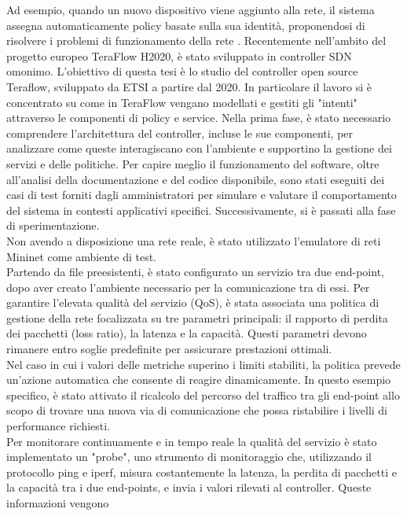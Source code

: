 Ad esempio, quando un nuovo dispositivo viene aggiunto alla rete, 
il sistema assegna automaticamente policy basate sulla sua identità, proponendosi di risolvere i problemi di funzionamento della rete \cite{qoe}.
Recentemente nell'ambito del progetto europeo TeraFlow H2020, è stato sviluppato in controller SDN omonimo. 
L'obiettivo di questa tesi è lo studio del controller open source Teraflow, sviluppato da ETSI \cite{etsi} a partire dal 2020.
In particolare il lavoro si è concentrato su come in TeraFlow vengano modellati e gestiti gli "intenti" attraverso le componenti di policy e service.
Nella prima fase, è stato necessario comprendere l'architettura del controller, incluse le sue componenti, per analizzare come queste interagiscano con l'ambiente e supportino la gestione dei servizi e delle politiche.
Per capire meglio il funzionamento del software, oltre all'analisi della documentazione e del codice disponibile, sono stati eseguiti dei casi di test forniti dagli amministratori per simulare e valutare il comportamento del sistema in contesti applicativi specifici.
Successivamente, si è passati alla fase di sperimentazione.
\\Non avendo a disposizione una rete reale, è stato utilizzato l'emulatore di reti Mininet come ambiente di test.
\\Partendo da file preesistenti, è stato configurato un servizio tra due end-point, dopo aver creato l'ambiente necessario per la comunicazione tra di essi. Per garantire l'elevata qualità del servizio (QoS), è stata associata una politica di 
gestione della rete focalizzata su tre parametri principali: il rapporto di perdita dei pacchetti (loss ratio), la latenza e la capacità. 
Questi parametri devono rimanere entro soglie predefinite per assicurare prestazioni ottimali.
\\Nel caso in cui i valori delle metriche superino i limiti stabiliti, la politica prevede un'azione automatica che consente di reagire dinamicamente. 
In questo esempio specifico, è stato attivato il ricalcolo del percorso 
del traffico tra gli end-point allo scopo di trovare una nuova via di comunicazione che possa ristabilire i livelli di performance richiesti.
\\Per monitorare continuamente e in tempo reale la qualità del servizio è stato implementato un "probe", uno strumento di monitoraggio che, utilizzando il protocollo ping e iperf,
misura costantemente la latenza, la perdita di pacchetti e la capacità tra i due end-points, e invia i valori rilevati al controller. Queste informazioni vengono 
